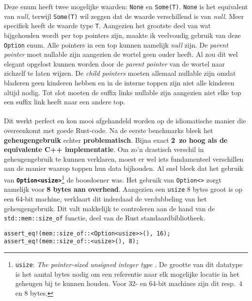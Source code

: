Deze enum heeft twee mogelijke waarden: \texttt{None} en \texttt{Some(T)}.
\texttt{None} is het equivalent van \textit{null}, terwijl \texttt{Some(T)} wil zeggen dat de waarde verschillend is van \textit{null}.
Meer specifiek heeft de waarde type \texttt{T}.
Aangezien het grootste deel van wat bijgehouden wordt per top pointers zijn, maakte ik veelvoudig gebruik van deze \texttt{Option} enum.
Alle pointers in een top kunnen namelijk \textit{null} zijn.
De \textit{parent pointer} moet nullable zijn aangezien de wortel geen ouder heeft.
Al zou dit wel elegant opgelost kunnen worden door de \textit{parent pointer} van de wortel naar zichzelf te laten wijzen.
De \textit{child pointers} moeten allemaal nullable zijn omdat bladeren geen kinderen hebben en in de interne toppen zijn niet alle kinderen altijd nodig.
Tot slot moeten de suffix links nullable zijn aangezien niet elke top een suffix link heeft naar een andere top.
\\ \\
Dit werkt perfect en kon mooi afgehandeld worden op de idiomatische manier die overeenkomt met goede Rust-code.
Na de eerste benchmarks bleek het \textbf{geheugengebruik} echter \textbf{problematisch}.
Bijna exact \textbf{2\times\ zo hoog als de equivalente C++ implementatie}.
Om zo'n drastisch verschil in geheugengebruik te kunnen verklaren, moest er wel iets fundamenteel verschillen aan de manier waarop toppen hun data bijhouden.
Al snel bleek dat het gebruik van \textbf{\texttt{Option<usize>}}\footnote{\texttt{usize}: \textit{The pointer-sized unsigned integer type \cite{usize}}. De grootte van dit datatype is het aantal bytes nodig om een referentie naar elk mogelijke locatie in het geheugen bij te kunnen houden. Voor 32- en 64-bit machines zijn dit resp.~4 en 8 bytes.} de boosdoener was.
Het gebruik van \texttt{Option<>} zorgt namelijk voor \textbf{8 bytes aan overhead}.
Aangezien een \texttt{usize} 8 bytes groot is op een 64-bit machine, verklaart dit inderdaad de verdubbeling van het geheugengebruik.
Dit valt makkelijk te controleren aan de hand van de \texttt{std::mem::size\_of} functie, deel van de Rust standaardbibliotheek.
\begin{verbatim}
assert_eq!(mem::size_of::<Option<usize>>(), 16);
assert_eq!(mem::size_of::<usize>(), 8);
\end{verbatim}

